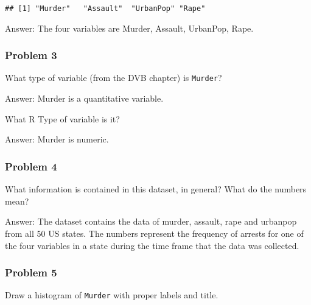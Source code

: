 \documentclass[
]{article}
\newenvironment{Shaded}{\begin{snugshade}}{\end{snugshade}}
\newcommand{\AttributeTok}[1]{\textcolor[rgb]{0.77,0.63,0.00}{#1}}
\newcommand{\DecValTok}[1]{\textcolor[rgb]{0.00,0.00,0.81}{#1}}
\newcommand{\FunctionTok}[1]{\textcolor[rgb]{0.00,0.00,0.00}{#1}}
\newcommand{\NormalTok}[1]{#1}
\newcommand{\SpecialCharTok}[1]{\textcolor[rgb]{0.00,0.00,0.00}{#1}}
\newcommand{\StringTok}[1]{\textcolor[rgb]{0.31,0.60,0.02}{#1}}
\begin{document}
\begin{verbatim}
## [1] "Murder"   "Assault"  "UrbanPop" "Rape"
\end{verbatim}

Answer: The four variables are Murder, Assault, UrbanPop, Rape.

\hypertarget{problem-3}{%
\subsubsection{Problem 3}\label{problem-3}}

What type of variable (from the DVB chapter) is \texttt{Murder}?

Answer: Murder is a quantitative variable.

What R Type of variable is it?

Answer: Murder is numeric.

\hypertarget{problem-4}{%
\subsubsection{Problem 4}\label{problem-4}}

What information is contained in this dataset, in general? What do the
numbers mean?

Answer: The dataset contains the data of murder, assault, rape and
urbanpop from all 50 US states. The numbers represent the frequency of
arrests for one of the four variables in a state during the time frame
that the data was collected.

\hypertarget{problem-5}{%
\subsubsection{Problem 5}\label{problem-5}}

Draw a histogram of \texttt{Murder} with proper labels and title.

\begin{Shaded}
\end{Shaded}
\end{document}
